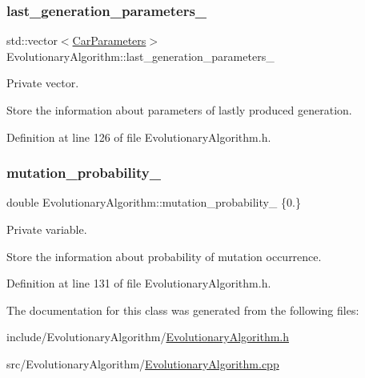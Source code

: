 \subsubsection{\texorpdfstring{last\+\_\+generation\+\_\+parameters\+\_\+}{last\_generation\_parameters\_}}
{\footnotesize\ttfamily std\+::vector$<$\hyperlink{classCarParameters}{Car\+Parameters}$>$ Evolutionary\+Algorithm\+::last\+\_\+generation\+\_\+parameters\+\_\+\hspace{0.3cm}{\ttfamily [private]}}



Private vector. 

Store the information about parameters of lastly produced generation. 

Definition at line 126 of file Evolutionary\+Algorithm.\+h.

\mbox{\label{classEvolutionaryAlgorithm_ab847e49664c7b97e1e55963e6f33b332}} 
\subsubsection{\texorpdfstring{mutation\+\_\+probability\+\_\+}{mutation\_probability\_}}
{\footnotesize\ttfamily double Evolutionary\+Algorithm\+::mutation\+\_\+probability\+\_\+ \{0.\}\hspace{0.3cm}{\ttfamily [private]}}



Private variable. 

Store the information about probability of mutation occurrence. 

Definition at line 131 of file Evolutionary\+Algorithm.\+h.



The documentation for this class was generated from the following files\+:\begin{DoxyCompactItemize}
\item 
include/\+Evolutionary\+Algorithm/\hyperlink{EvolutionaryAlgorithm_8h}{Evolutionary\+Algorithm.\+h}\item 
src/\+Evolutionary\+Algorithm/\hyperlink{EvolutionaryAlgorithm_8cpp}{Evolutionary\+Algorithm.\+cpp}\end{DoxyCompactItemize}
